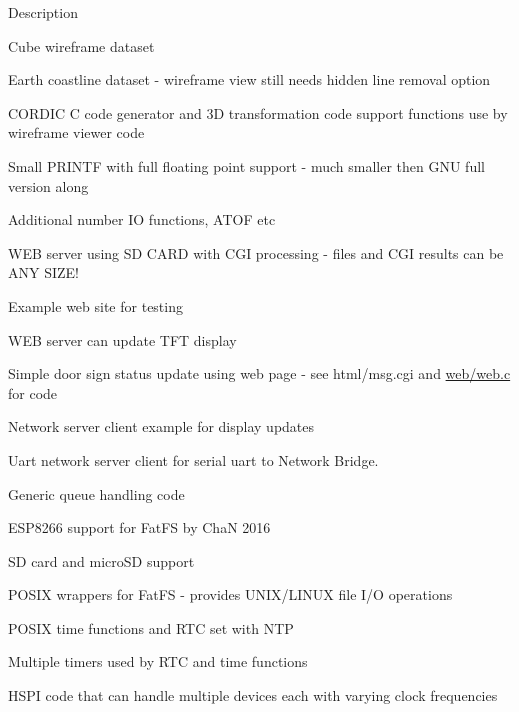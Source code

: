 \begin{DoxyParagraph}{Description}
\begin{DoxyItemize}
\begin{DoxyItemize}
\begin{DoxyItemize}
\begin{DoxyItemize}
\item Cube wireframe dataset
\item Earth coastline dataset -\/ wireframe view still needs hidden line removal option
\end{DoxyItemize}
\end{DoxyItemize}
\item C\+O\+R\+D\+IC C code generator and 3D transformation code support functions use by wireframe viewer code
\item Small P\+R\+I\+N\+TF with full floating point support -\/ much smaller then G\+NU full version along
\item Additional number IO functions, A\+T\+OF etc
\item W\+EB server using SD C\+A\+RD with C\+GI processing -\/ files and C\+GI results can be A\+NY S\+I\+Z\+E!
\begin{DoxyItemize}
\item Example web site for testing
\item W\+EB server can update T\+FT display
\begin{DoxyItemize}
\item Simple door sign status update using web page -\/ see html/msg.\+cgi and \hyperlink{web_8c}{web/web.\+c} for code
\end{DoxyItemize}
\end{DoxyItemize}
\item Network server client example for display updates
\item Uart network server client for serial uart to Network Bridge.
\item Generic queue handling code
\item E\+S\+P8266 support for Fat\+FS by ChaN 2016
\begin{DoxyItemize}
\item SD card and micro\+SD support
\end{DoxyItemize}
\item P\+O\+S\+IX wrappers for Fat\+FS -\/ provides U\+N\+I\+X/\+L\+I\+N\+UX file I/O operations
\item P\+O\+S\+IX time functions and R\+TC set with N\+TP
\item Multiple timers used by R\+TC and time functions
\item H\+S\+PI code that can handle multiple devices each with varying clock frequencies
\end{DoxyItemize}
\end{DoxyItemize}
\end{DoxyParagraph}

